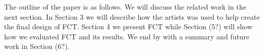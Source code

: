 The outline of the paper is as follows. We will discuss the related work in the next section. In Section 3 we will describe how the artists was used to help create the final design of FCT. Section 4 we present FCT while Section (5?) will show how we evaluated FCT and its results. We end by with a summary and future work in Section (6?).






